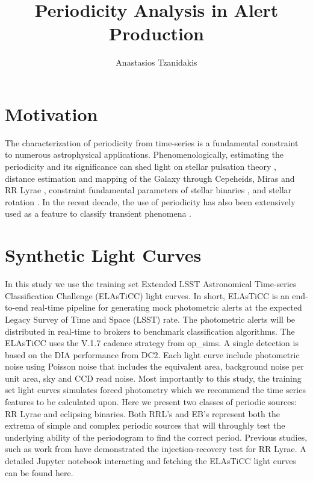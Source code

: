 \documentclass[DM,authoryear,toc]{lsstdoc}
\title{Periodicity Analysis in Alert Production}
\author{%
Anastasios Tzanidakis
}
\date{\vcsDate}
\begin{document}
\maketitle


\section{Motivation}
The characterization of periodicity from time-series is a fundamental constraint to numerous astrophysical applications. Phenomenologically, estimating the periodicity and its significance can shed light on stellar pulsation theory \citep{Antonello:Antonello81}, distance estimation and mapping of the Galaxy through Cepeheids, Miras and RR Lyrae \citep{Skowron:Skowron2019}, constraint fundamental parameters of stellar binaries \citep{Farinella:Farinella1979}, and stellar rotation \citep{Walkowicz:Walkowicz13}. In the recent decade, the use of periodicity has also been extensively used as a feature to classify transient phenomena \citep{Richards:R13}.



\section{Synthetic Light Curves}
In this study we use the training set Extended LSST Astronomical Time-series Classification Challenge (ELAsTiCC) light curves. In short, ELAsTiCC is an end-to-end real-time pipeline for generating mock photometric alerts at the expected Legacy Survey of Time and Space (LSST) rate. The photometric alerts will be distributed in real-time to brokers to benchmark classification algorithms. The ELAsTiCC uses the V.1.7 cadence strategy from op_sims. A single detection is based on the DIA performance from DC2. Each light curve include photometric noise using Poisson noise that includes the equivalent area, background noise per unit area, sky and CCD read noise. Most importantly to this study, the training set light curves simulates forced photometry which we recommend the time series features to be calculated upon. Here we present two classes of periodic sources: RR Lyrae and eclipsing binaries. Both RRL's and EB's represent both the extrema of simple and complex periodic sources that will throughly test the underlying ability of the periodogram to find the correct period. Previous studies, such as work from \citet{Oluseyi:Oluseyi2012} have demonstrated the injection-recovery test for RR Lyrae. A detailed Jupyter notebook interacting and fetching the ELAsTiCC light curves can be found here. 
\end{document}
